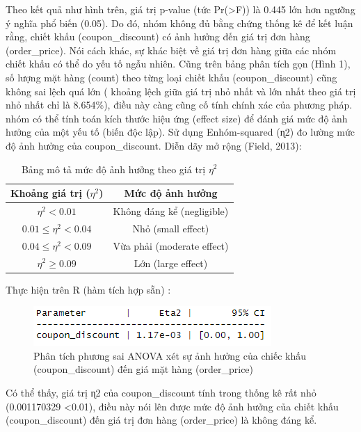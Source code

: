 Theo kết quả như hình trên, giá trị p-value (tức Pr(>F)) là 0.445 lớn hơn ngưỡng ý nghĩa phổ biến (0.05). Do đó, nhóm không đủ bằng chứng thống kê để kết luận rằng, chiết khấu (coupon\_discount) có ảnh hưởng đến giá trị đơn hàng (order\_price). Nói cách khác, sự khác biệt về giá trị đơn hàng giữa các nhóm chiết khấu có thể do yếu tố ngẫu nhiên.
Cũng trên bảng phân tích gọn (Hình 1),  số lượng mặt hàng (count) theo từng loại chiết khấu (coupon\_discount) cũng  không sai lệch quá lớn ( khoảng lệch giữa giá trị nhỏ nhất và lớn nhất theo giá trị nhỏ nhất chỉ là 8.654\%), điều này càng cũng cố tính chính xác của phương pháp.
nhóm có thể tính toán kích thước hiệu ứng (effect size) để đánh giá mức độ ảnh hưởng của một yếu tố (biến độc lập). Sử dụng Enhóm-squared (ɳ2) đo lường mức độ ảnh hưởng của coupon\_discount. Diễn dãy mở rộng (Field, 2013):

\begin{table}[ht]
    \centering
    \begin{tabular}{|c|c|}
    \hline
    \textbf{Khoảng giá trị ($\eta^2$)} & \textbf{Mức độ ảnh hưởng} \\ 
    \hline
    $\eta^2 < 0.01$ & Không đáng kể (negligible) \\ 
    \hline
    $0.01 \leq \eta^2 < 0.04$ & Nhỏ (small effect) \\ 
    \hline
    $0.04 \leq \eta^2 < 0.09$ & Vừa phải (moderate effect) \\ 
    \hline
    $\eta^2 \geq 0.09$ & Lớn (large effect) \\ 
    \hline
    \end{tabular}
    \caption{Bảng mô tả mức độ ảnh hưởng theo giá trị $\eta^2$}
    \label{table:effect_size}
\end{table}

Thực hiện trên R (hàm tích hợp sẵn) :
\begin{figure}[!htbp]
    \centering
    \includegraphics[width=0.6\linewidth]{graphics/5.3.3.png}
    \caption{Phân tích phương sai ANOVA xét sự ảnh hưởng của chiếc khấu (coupon\_discount) đến giá mặt hàng (order\_price)}
\end{figure}

Có thể thấy, giá trị ɳ2  của  coupon\_discount  tính trong thống kê rất nhỏ (0.001170329 <0.01), điều này nói lên được mức độ ảnh hưởng của chiết khấu (coupon\_discount) đến giá trị đơn hàng (order\_price) là không đáng kể.